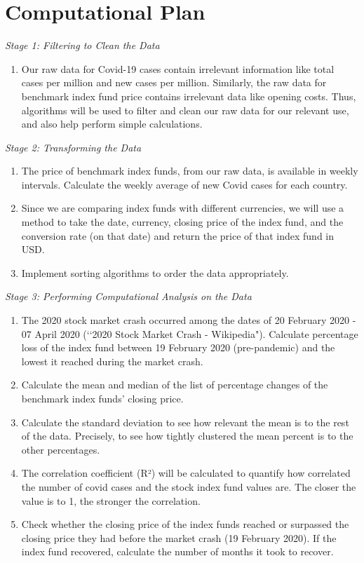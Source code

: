 \documentclass[fontsize=11pt]{article}
\begin{document}
\section*{Computational Plan}

\emph {Stage 1: Filtering to Clean the Data}


\begin{enumerate}
\setcounter{enumi}{0}
\item Our raw data for Covid-19 cases contain irrelevant information like total cases per million and new cases per million. Similarly, the raw data for benchmark index fund price contains irrelevant data like opening costs. Thus, algorithms will be used to filter and clean our raw data for our relevant use, and also help perform simple calculations. \\
\end{enumerate}
\emph{Stage 2: Transforming the Data}
\begin{enumerate}
\setcounter{enumi}{0}
\item The price of benchmark index funds, from our raw data, is available in weekly intervals. Calculate the weekly average of new Covid cases for each country.
\item Since we are comparing index funds with different currencies, we will use a method to take the date, currency, closing price of the index fund, and the conversion rate (on that date) and return the price of that index fund in USD.
\item Implement sorting algorithms to order the data appropriately.\\
\end{enumerate}
\emph{Stage 3: Performing Computational Analysis on the Data}
\begin{enumerate}
\setcounter{enumi}{0}
\item The 2020 stock market crash occurred among the dates of 20 February 2020 - 07 April 2020 (\lq\lq 2020 Stock Market Crash - Wikipedia"). Calculate percentage loss of the index fund between 19 February 2020 (pre-pandemic) and the lowest it reached during the market crash.
\item Calculate the mean and median of the list of percentage changes of the benchmark index funds’ closing price.
\item Calculate the standard deviation to see how relevant the mean is to the rest of the data. Precisely, to see how tightly clustered the mean percent is to the other percentages. 
\item The correlation coefficient (R²) will be calculated to quantify how correlated the number of covid cases and the stock index fund values are. The closer the value is to 1, the stronger the correlation.
\item Check whether the closing price of the index funds reached or surpassed the closing price they had before the market crash (19 February 2020). If the index fund recovered, calculate the number of months it took to recover.\\
\end{enumerate}
\end{document}

